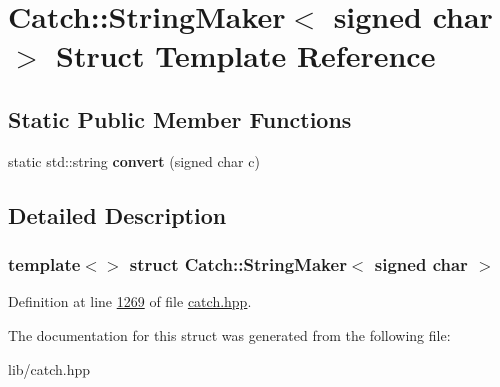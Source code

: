 \hypertarget{structCatch_1_1StringMaker_3_01signed_01char_01_4}{}\section{Catch\+::String\+Maker$<$ signed char $>$ Struct Template Reference}
\label{structCatch_1_1StringMaker_3_01signed_01char_01_4}
\subsection*{Static Public Member Functions}
\begin{DoxyCompactItemize}
\item 
\mbox{\label{structCatch_1_1StringMaker_3_01signed_01char_01_4_a5ec41f32916539dc90130539db8222cf}} 
static std\+::string {\bfseries convert} (signed char c)
\end{DoxyCompactItemize}


\subsection{Detailed Description}
\subsubsection*{template$<$$>$\newline
struct Catch\+::\+String\+Maker$<$ signed char $>$}



Definition at line \mbox{\hyperlink{catch_8hpp_source_l01269}{1269}} of file \mbox{\hyperlink{catch_8hpp_source}{catch.\+hpp}}.



The documentation for this struct was generated from the following file\+:\begin{DoxyCompactItemize}
\item 
lib/catch.\+hpp\end{DoxyCompactItemize}
